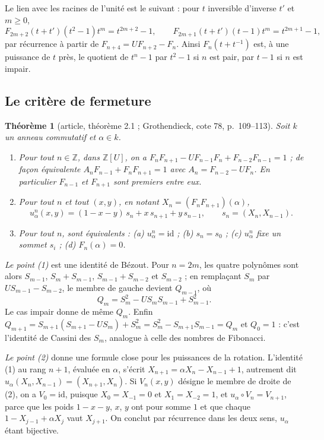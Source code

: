\documentclass[11pt,a4paper]{amsart}
\theoremstyle{definition}
\theoremstyle{plain}
\newtheorem{theoreme}{Théorème}
\theoremstyle{remark}
\newcommand{\Z}{\mathbb Z}
\newcommand{\id}{\mathrm{id}}
\begin{document}
Le lien avec les racines de l'unité est le suivant : pour $t$ inversible d'inverse $t'$ et $m \ge 0$,
\[
F_{2m+2}(t + t')(t^2 - 1)t^m = t^{2m+2} - 1, \qquad F_{2m+1}(t + t')(t - 1)t^m = t^{2m+1} - 1,
\]
par récurrence à partir de $F_{n+4} = UF_{n+2} - F_n$. Ainsi $F_n(t + t^{-1})$ est, à une puissance de $t$ près, le quotient de $t^n - 1$ par $t^2 - 1$ si $n$ est pair, par $t - 1$ si $n$ est impair.

\subsection{Le critère de fermeture}

\begin{theoreme}[article, théorème 2.1 ; Grothendieck, cote 78, p.~109--113]\label{thm:fermeture}
Soit $k$ un anneau commutatif et $\alpha \in k$.
\begin{enumerate}
\item Pour tout $n \in \Z$, dans $\Z[U]$, on a $F_nF_{n+1} - UF_{n-1}F_n + F_{n-2}F_{n-1} = 1$ ; de façon équivalente $A_nF_{n-1} + F_nF_{n+1} = 1$ avec $A_n = F_{n-2} - UF_n$. En particulier $F_{n-1}$ et $F_{n+1}$ sont premiers entre eux.
\item Pour tout $n$ et tout $(x, y)$, en notant $X_n = (F_nF_{n+1})(\alpha)$,
\[
u_\alpha^n(x, y) = (1 - x - y)\,s_n + x\,s_{n+1} + y\,s_{n-1}, \qquad s_n = (X_n, X_{n-1}).
\]
\item Pour tout $n$, sont équivalents : (a) $u_\alpha^n = \id$ ; (b) $s_n = s_0$ ; (c) $u_\alpha^n$ fixe un sommet $s_i$ ; (d) $F_n(\alpha) = 0$.
\end{enumerate}
\end{theoreme}

\emph{Le point (1)} est une identité de Bézout. Pour $n = 2m$, les quatre polynômes sont alors $S_{m-1}$, $S_m + S_{m-1}$, $S_{m-1} + S_{m-2}$ et $S_{m-2}$ ; en remplaçant $S_m$ par $US_{m-1} - S_{m-2}$, le membre de gauche devient $Q_{m-1}$, où
\[
Q_m = S_m^2 - US_mS_{m-1} + S_{m-1}^2.
\]
Le cas impair donne de même $Q_m$. Enfin $Q_{m+1} = S_{m+1}(S_{m+1} - US_m) + S_m^2 = S_m^2 - S_{m+1}S_{m-1} = Q_m$ et $Q_0 = 1$ : c'est l'identité de Cassini des $S_m$, analogue à celle des nombres de Fibonacci.

\emph{Le point (2)} donne une formule close pour les puissances de la rotation. L'identité (1) au rang $n+1$, évaluée en $\alpha$, s'écrit $X_{n+1} = \alpha X_n - X_{n-1} + 1$, autrement dit $u_\alpha(X_n, X_{n-1}) = (X_{n+1}, X_n)$. Si $V_n(x, y)$ désigne le membre de droite de (2), on a $V_0 = \id$, puisque $X_0 = X_{-1} = 0$ et $X_1 = X_{-2} = 1$, et $u_\alpha \circ V_n = V_{n+1}$, parce que les poids $1 - x - y$, $x$, $y$ ont pour somme $1$ et que chaque $1 - X_{j-1} + \alpha X_j$ vaut $X_{j+1}$. On conclut par récurrence dans les deux sens, $u_\alpha$ étant bijective.
\end{document}
